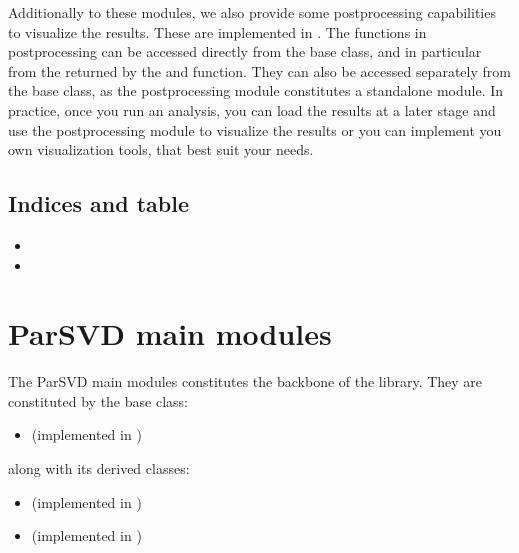 \documentclass[letterpaper,10pt,english]{sphinxmanual}
\begin{document}
\sphinxAtStartPar
Additionally to these modules, we also provide some post\sphinxhyphen{}processing capabilities
to visualize the results. These are implemented in  {\hyperref[\detokenize{index:postprocessing-module}]{}}.
The functions in post\sphinxhyphen{}processing can be accessed directly from the base class, and in particular
from the  returned by the  and  function.
They can also be accessed separately from the base class, as the post\sphinxhyphen{}processing module
constitutes a standalone module. In practice, once you run an analysis, you can load the
results at a later stage and use the post\sphinxhyphen{}processing module to visualize the results or
you can implement you own visualization tools, that best suit your needs.


\section{Indices and table}
\label{\detokenize{index:indices-and-table}}\begin{itemize}
\item {} 
\sphinxAtStartPar
{}

\item {} 
\sphinxAtStartPar
{}

\end{itemize}


\chapter{ParSVD main modules}
\label{\detokenize{index:parsvd-main-modules}}
\sphinxAtStartPar
The ParSVD main modules constitutes the backbone of the  library.
They are constituted by the base class:
\begin{itemize}
\item {} 
\sphinxAtStartPar
{} (implemented in ) {\hyperref[\detokenize{index:parsvd-base-class}]{}}

\end{itemize}

\sphinxAtStartPar
along with its derived classes:
\begin{itemize}
\item {} 
\sphinxAtStartPar
{} (implemented in ) {\hyperref[\detokenize{index:module-pyparsvd.parsvd_serial}]{}}

\item {} 
\sphinxAtStartPar
{} (implemented in ) {\hyperref[\detokenize{index:module-pyparsvd.parsvd_parallel}]{}}

\end{itemize}
\end{document}
